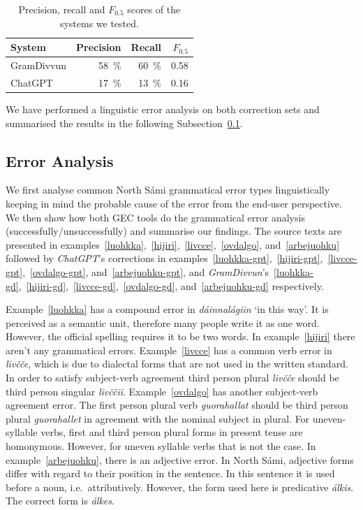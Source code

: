\documentclass[free]{flammie}
\begin{document}
\begin{table}
    \centering
    \begin{tabular}{lrrr}
        \toprule
        System & Precision & Recall & $F_{0.5}$ \\
        \midrule
        GramDivvun & 58~\% & 60~\% &  0.58 \\
        ChatGPT & 17~\% & 13~\%  & 0.16 \\
        \bottomrule
    \end{tabular}
    \caption{Precision, recall and $F_{0.5}$ scores of the systems
    we tested.\label{fig:f-scores}}
\end{table}


We have performed a linguistic error analysis on both correction sets and
summarised the results in the following Subsection~\ref{subsec:error-analysis}.

\subsection{Error Analysis}\label{subsec:error-analysis}

We first analyse common North Sámi grammatical error types linguistically
keeping in mind the probable cause of the error from the end-user perspective.
We then show how both GEC tools do the grammatical error analysis
(successfully/unsuccessfully) and summarise our findings.  The source texts are
presented in examples~\ref{luohkka},~\ref{hijiri},~\ref{livcce},~\ref{ovdalgo},
and~\ref{arbejuohku} followed by \textit{ChatGPT}'s corrections in
examples~\ref{luohkka-gpt},~\ref{hijiri-gpt},~\ref{livcce-gpt},~\ref{ovdalgo-gpt},
and~\ref{arbejuohku-gpt}, and
\textit{GramDivvun}'s~\ref{luohkka-gd},~\ref{hijiri-gd},~\ref{livcce-gd},~\ref{ovdalgo-gd},
and~\ref{arbejuohku-gd} respectively.

Example~\ref{luohkka} has a compound error in \textit{dáinnalágiin} `in this
way'. It is perceived as a semantic unit, therefore many people write it as one
word. However, the official spelling requires it to be two words.  In
example~\ref{hijiri} there aren't any grammatical errors.  Example~\ref{livcce}
has a common verb error in \textit{livčče}, which is due to dialectal forms that
are not used in the written standard. In order to satisfy subject-verb agreement
third person plural \textit{livčče} should be third person singular
\textit{livččii}.  Example~\ref{ovdalgo} has another subject-verb agreement
error. The first person plural verb \textit{guorahallat} should be third person
plural \textit{guorahallet} in agreement with the nominal subject in plural. For
uneven-syllable verbs, first and third person plural forms in present tense are
homonymous. However, for uneven syllable verbs that is not the case.  In
example~\ref{arbejuohku}, there is an adjective error. In North Sámi, adjective forms
differ with regard to their position in the sentence. In this sentence it is
used before a noun, i.e.\ attributively. However, the form used here is
predicative \textit{álkis}. The correct form is \textit{álkes}.
\end{document}
